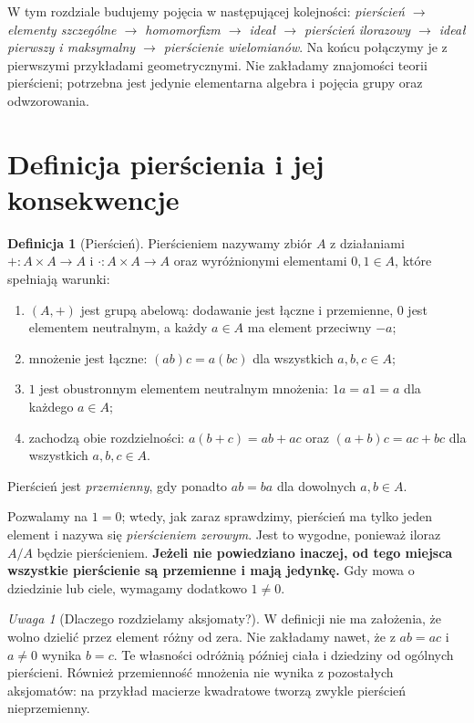 \documentclass[11pt,a4paper,openany]{report}
\numberwithin{equation}{section}
\theoremstyle{plain}
\theoremstyle{definition}
\newtheorem{definicja}[twierdzenie]{Definicja}
\theoremstyle{remark}
\newtheorem{uwaga}[twierdzenie]{Uwaga}
\begin{document}
W tym rozdziale budujemy pojęcia w następującej kolejności:
\emph{pierścień $\to$ elementy szczególne $\to$ homomorfizm $\to$
ideał $\to$ pierścień ilorazowy $\to$ ideał pierwszy i maksymalny $\to$
pierścienie wielomianów}. Na końcu połączymy je z pierwszymi przykładami
geometrycznymi. Nie zakładamy znajomości teorii pierścieni; potrzebna jest
jedynie elementarna algebra i pojęcia grupy oraz odwzorowania.

\section{Definicja pierścienia i jej konsekwencje}

\begin{definicja}[Pierścień]
\label{def:pierscien}
Pierścieniem nazywamy zbiór $A$ z działaniami
$+\colon A\times A\to A$ i $\cdot\colon A\times A\to A$ oraz wyróżnionymi
elementami $0,1\in A$, które spełniają warunki:
\begin{enumerate}[label=(P\arabic*)]
\item $(A,+)$ jest grupą abelową: dodawanie jest łączne i przemienne,
$0$ jest elementem neutralnym, a każdy $a\in A$ ma element przeciwny $-a$;
\item mnożenie jest łączne: $(ab)c=a(bc)$ dla wszystkich $a,b,c\in A$;
\item $1$ jest obustronnym elementem neutralnym mnożenia:
$1a=a1=a$ dla każdego $a\in A$;
\item zachodzą obie rozdzielności:
$a(b+c)=ab+ac$ oraz $(a+b)c=ac+bc$ dla wszystkich $a,b,c\in A$.
\end{enumerate}
Pierścień jest \emph{przemienny}, gdy ponadto $ab=ba$ dla dowolnych $a,b\in A$.
\end{definicja}

Pozwalamy na $1=0$; wtedy, jak zaraz sprawdzimy, pierścień ma tylko jeden
element i nazywa się \emph{pierścieniem zerowym}. Jest to wygodne, ponieważ
iloraz $A/A$ będzie pierścieniem. \textbf{Jeżeli nie powiedziano inaczej,
od tego miejsca wszystkie pierścienie są przemienne i mają jedynkę.}
Gdy mowa o dziedzinie lub ciele, wymagamy dodatkowo $1\ne0$.

\begin{uwaga}[Dlaczego rozdzielamy aksjomaty?]
W definicji nie ma założenia, że wolno dzielić przez element różny od zera.
Nie zakładamy nawet, że z $ab=ac$ i $a\ne0$ wynika $b=c$.
Te własności odróżnią później ciała i dziedziny od ogólnych pierścieni.
Również przemienność mnożenia nie wynika z pozostałych aksjomatów:
na przykład macierze kwadratowe tworzą zwykle pierścień nieprzemienny.
\end{uwaga}
\end{document}
